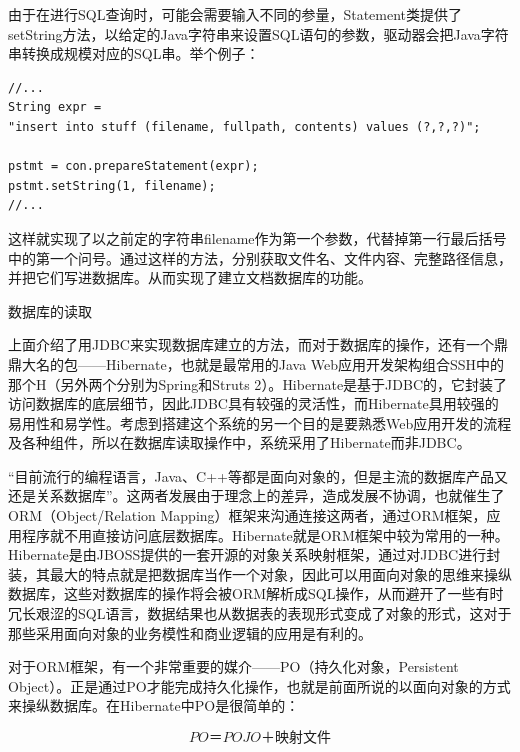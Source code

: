 \documentclass[12pt,a4paper]{article}
\begin{document}
	由于在进行{\Times SQL}查询时，可能会需要输入不同的参量，{\Times Statement}类提供了{\Times setString}方法，以给定的{\Times Java}字符串来设置{\Times SQL}语句的参数，驱动器会把{\Times Java}字符串转换成规模对应的{\Times SQL}串。举个例子：
		\lstset{language=Java,frame=lines}
	\begin{lstlisting}
//...
String expr =
"insert into stuff (filename, fullpath, contents) values (?,?,?)";

pstmt = con.prepareStatement(expr);
pstmt.setString(1, filename);
//...
	\end{lstlisting}	
	
	这样就实现了以之前定的字符串{\Times filename}作为第一个参数，代替掉第一行最后括号中的第一个问号。通过这样的方法，分别获取文件名、文件内容、完整路径信息，并把它们写进数据库。从而实现了建立文档数据库的功能。
	

	数据库的读取
	
	上面介绍了用{\Times JDBC}来实现数据库建立的方法，而对于数据库的操作，还有一个鼎鼎大名的包——{\Times Hibernate}，也就是最常用的{\Times Java Web}应用开发架构组合{\Times SSH}中的那个{\Times H}（另外两个分别为{\Times Spring}和{\Times Struts 2}）。{\Times Hibernate}是基于{\Times JDBC}的，它封装了访问数据库的底层细节，因此{\Times JDBC}具有较强的灵活性，而{\Times Hibernate}具用较强的易用性和易学性。考虑到搭建这个系统的另一个目的是要熟悉Web应用开发的流程及各种组件，所以在数据库读取操作中，系统采用了{\Times Hibernate}而非{\Times JDBC}。
	
	“目前流行的编程语言，{\Times Java}、{\Times C++}等都是面向对象的，但是主流的数据库产品又还是关系数据库”\cite{li2008}。这两者发展由于理念上的差异，造成发展不协调，也就催生了{\Times ORM}（{\Times Object/Relation Mapping}）框架来沟通连接这两者，通过{\Times ORM}框架，应用程序就不用直接访问底层数据库。{\Times Hibernate}就是{\Times ORM}框架中较为常用的一种。{\Times Hibernate}是由{\Times JBOSS}提供的一套开源的对象关系映射框架，通过对{\Times JDBC}进行封装，其最大的特点就是把数据库当作一个对象，因此可以用面向对象的思维来操纵数据库，这些对数据库的操作将会被{\Times ORM}解析成{\Times SQL}操作，从而避开了一些有时冗长艰涩的SQL语言，数据结果也从数据表的表现形式变成了对象的形式，这对于那些采用面向对象的业务模性和商业逻辑的应用是有利的。
	
	对于{\Times ORM}框架，有一个非常重要的媒介——{\Times PO}（持久化对象，{\Times Persistent Object}）。正是通过{\Times PO}才能完成持久化操作，也就是前面所说的以面向对象的方式来操纵数据库。在{\Times Hibernate}中{\Times PO}是很简单的：

	$$ PO ＝ POJO ＋ 映射文件 $$
\end{document}
